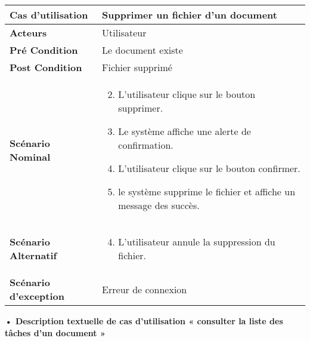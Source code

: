 \begin{longtable}{|p{5cm}|p{10cm}|}
\hline
\textbf{Cas d'utilisation}&Supprimer un fichier d'un document\\
\hline
\textbf{Acteurs}&Utilisateur\\
\hline
\textbf{Pré Condition}&Le document existe\\
\hline
\textbf{Post Condition}&Fichier supprimé\\
\hline
\textbf{Scénario Nominal}&
\vspace{-\baselineskip}
\begin{enumerate}
    \setcounter{enumi}{1}
    \item L'utilisateur clique sur le bouton supprimer.
    \item Le système affiche une alerte de confirmation.
    \item L'utilisateur clique sur le bouton confirmer.
    \item le système supprime le fichier et affiche un message des succès.
    
    
    
\end{enumerate}\\
\hline
\textbf{Scénario Alternatif}&
\vspace{-\baselineskip}
\begin{enumerate}
    \setcounter{enumi}{3}
    \item L'utilisateur annule la suppression du fichier.
\end{enumerate}\\
\hline
\textbf{Scénario d'exception}&Erreur de connexion\\
\hline
\end{longtable}



\textbf{•	Description textuelle de cas d'utilisation « consulter la liste des tâches d'un document »}

